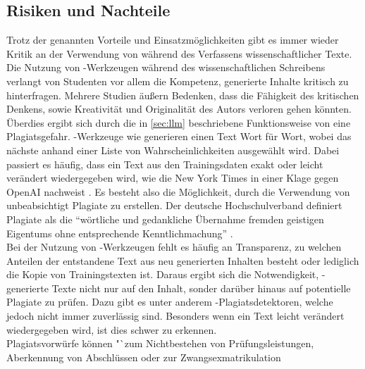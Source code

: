 \documentclass[../main.tex]{subfiles}
\begin{document}

\subsection{Risiken und Nachteile}
\label{sec:nachteile}

Trotz der genannten Vorteile und Einsatzmöglichkeiten gibt es immer wieder Kritik an der Verwendung von  während des Verfassens wissenschaftlicher Texte. 
Die Nutzung von -Werkzeugen während des wissenschaftlichen Schreibens verlangt von Studenten vor allem die Kompetenz, generierte Inhalte kritisch zu 
hinterfragen. Mehrere Studien äußern Bedenken, dass die Fähigkeit des kritischen Denkens, sowie Kreativität und Originalität des Autors verloren gehen könnten. \cite{ZukunftWissenschaftlichesPublizieren,teachers,BucherSchwarzerHolzwweißig}\\
Überdies ergibt sich durch die in \autoref{sec:llm} beschriebene Funktionsweise von  eine Plagiatsgefahr. -Werkzeuge wie  generieren einen Text Wort für Wort, wobei das nächste anhand 
einer Liste von Wahrscheinlichkeiten ausgewählt wird. Dabei passiert es häufig, dass ein Text aus den Trainingsdaten exakt oder leicht verändert wiedergegeben wird, wie die New York Times in 
einer Klage gegen OpenAI nachweist \cite{NYTimes}. Es besteht also die Möglichkeit, durch die Verwendung von  unbeabsichtigt Plagiate zu erstellen. Der deutsche Hochschulverband definiert Plagiate als 
die "`wörtliche und gedankliche Übernahme fremden geistigen Eigentums ohne entsprechende Kenntlichmachung"' \cite{Hochschulverband}. \\ Bei der Nutzung von -Werkzeugen fehlt es häufig an Transparenz, 
zu welchen Anteilen der entstandene Text aus neu generierten Inhalten besteht oder lediglich die Kopie von Trainingstexten ist. Daraus ergibt sich die Notwendigkeit, -generierte Texte nicht nur 
auf den Inhalt, sonder darüber hinaus auf potentielle Plagiate zu prüfen. Dazu gibt es unter anderem -Plagiatsdetektoren, welche jedoch nicht immer zuverlässig sind. Besonders wenn ein Text 
leicht verändert wiedergegeben wird, ist dies schwer zu erkennen.\\ Plagiatsvorwürfe können "`zum Nichtbestehen von Prüfungsleistungen, Aberkennung von Abschlüssen  oder  zur  Zwangsexmatrikulation  
\end{document}
